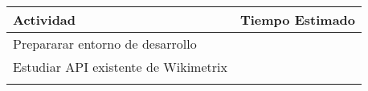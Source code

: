 \begin{table}[]
\begin{tabular}{|l|l|}
\hline
Actividad & Tiempo Estimado \\ \hline
Prepararar entorno de desarrollo          &                 \\ \hline
Estudiar API existente de Wikimetrix            &                 \\ \hline
            &                 \\ \hline
\end{tabular}
\end{table}